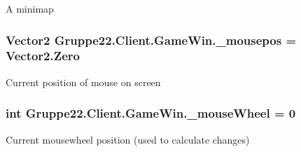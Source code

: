 A minimap 

\hypertarget{class_gruppe22_1_1_client_1_1_game_win_ae64e39fc0213b7db9121b53cf8bdb499}{
\subsubsection[{\-\_\-mousepos}]{\setlength{\rightskip}{0pt plus 5cm}Vector2 Gruppe22.\-Client.\-Game\-Win.\-\_\-mousepos = Vector2.\-Zero\hspace{0.3cm}{\ttfamily [protected]}}}\label{class_gruppe22_1_1_client_1_1_game_win_ae64e39fc0213b7db9121b53cf8bdb499}


Current position of mouse on screen 

\hypertarget{class_gruppe22_1_1_client_1_1_game_win_a07b8fca49486bb2e4946165899f027b3}{
\subsubsection[{\-\_\-mouse\-Wheel}]{\setlength{\rightskip}{0pt plus 5cm}int Gruppe22.\-Client.\-Game\-Win.\-\_\-mouse\-Wheel = 0\hspace{0.3cm}{\ttfamily [protected]}}}\label{class_gruppe22_1_1_client_1_1_game_win_a07b8fca49486bb2e4946165899f027b3}


Current mousewheel position (used to calculate changes) 

